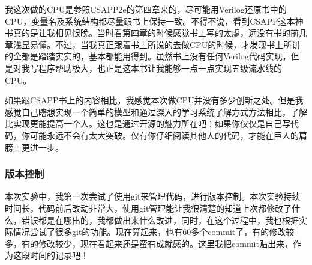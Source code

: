 我这次做的CPU是参照CSAPP2e的第四章来的，尽可能用Verilog还原书中的CPU，变量名及系统结构都尽量跟书上保持一致。不得不说，看到CSAPP这本神书真的是让我相见恨晚。当时看第四章的时候感觉书上写的太虚，远没有书的前几章浅显易懂。不过，当我真正跟着书上所说的去做CPU的时候，才发现书上所讲的全都是踏踏实实的，基本都能用得到。虽然书上没有任何Verilog代码实现，但是对我写程序帮助极大，也正是这本书让我能够一点一点实现五级流水线的CPU。

如果跟CSAPP书上的内容相比，我感觉本次做CPU并没有多少创新之处。但是我感觉自己瞎想实现一个简单的模型和通过深入的学习系统了解方式方法相比，了解比实现更能提高一个人。这也是通过开源的魅力所在吧：如果你仅仅是自己写代码，你可能永远不会有太大突破。仅有你仔细阅读其他人的代码，才能在巨人的肩膀上更进一步。

\subsubsection{版本控制}\label{ux7248ux672cux63a7ux5236}

本次实验中，我第一次尝试了使用git来管理代码，进行版本控制。本次实验持续时间长，代码前后改动非常大，使用git管理能让我很清楚的知道上次都修改了什么，错误都是在哪出的，我都做出来什么改进，同时，在这个过程中，我也根据实际情况尝试了很多git的功能。现在算起来，也有60多个commit了，有的修改较多，有的修改较少，现在看起来还是蛮有成就感的。这里我把commit贴出来，作为这段时间的记录吧！

